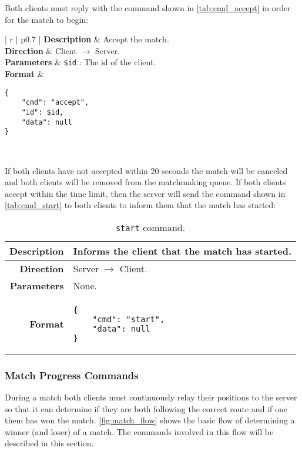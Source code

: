 Both clients must reply with the command shown in \autoref{tab:cmd_accept} in order for the match to begin:

\begin{table}[!ht]
	\centering
	\begin{tabular}{| r | p{} |}
		\hline
		\textbf{Description} & Accept the match. \\ \hline
		\textbf{Direction} & Client $\rightarrow$ Server. \\ \hline
		\textbf{Parameters} & \texttt{\$id} : The id of the client. \\ \hline
		\textbf{Format} &
\begin{lstlisting}[language=Command]
{
	"cmd": "accept",
	"id": $id,
	"data": null
}
\end{lstlisting}
		\\ \hline
	\end{tabular}
	\caption{\texttt{accept} command.}
	\label{tab:cmd_accept}
\end{table}

If both clients have not accepted within 20 seconds the match will be canceled and both clients will be removed from the matchmaking queue.
If both clients accept within the time limit, then the server will send the command shown in \autoref{tab:cmd_start} to both clients to inform them that the match has started:

\begin{table}[!ht]
	\centering
	\begin{tabular}{| r | p{} |}
		\hline
		\textbf{Description} & Informs the client that the match has started. \\ \hline
		\textbf{Direction} & Server $\rightarrow$ Client. \\ \hline
		\textbf{Parameters} & None. \\ \hline
		\textbf{Format} &
\begin{lstlisting}[language=Command]
{
	"cmd": "start",
	"data": null
}
\end{lstlisting}
		\\ \hline
	\end{tabular}
	\caption{\texttt{start} command.}
	\label{tab:cmd_start}
\end{table}

\subsubsection{Match Progress Commands}
During a match both clients must continuously relay their positions to the server so that it can determine if they are both following the correct route and if one them has won the match.
\autoref{fig:match_flow} shows the basic flow of determining a winner (and loser) of a match.
The commands involved in this flow will be described in this section.

